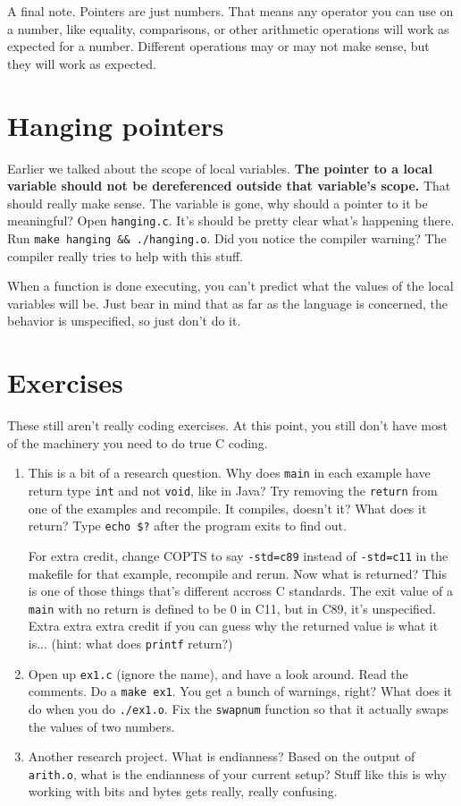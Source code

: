 \documentclass[ebook,11pt,oneside,openany]{memoir}
\newcommand{\cf}[1]{\texttt{#1}}
\begin{document}
A final note. Pointers are just numbers. That means any operator you can use on a number, like equality, comparisons, or other arithmetic operations will work as expected for a number. Different operations may or may not make sense, but they will work as expected.

\section{Hanging pointers}

Earlier we talked about the scope of local variables. \textbf{The pointer to a local variable should not be dereferenced outside that variable's scope.} That should really make sense. The variable is gone, why should a pointer to it be meaningful? Open \texttt{hanging.c}. It's should be pretty clear what's happening there. Run \texttt{make hanging \&\& ./hanging.o}. Did you notice the compiler warning? The compiler really tries to help with this stuff. 

When a function is done executing, you can't predict what the values of the local variables will be. Just bear in mind that as far as the language is concerned, the behavior is unspecified, so just don't do it.

\section{Exercises}

These still aren't really coding exercises. At this point, you still don't have most of the machinery you need to do true C coding.

\begin{enumerate}
\item This is a bit of a research question. Why does \texttt{main} in each example have return type \texttt{int} and not \texttt{void}, like in Java? Try removing the \texttt{return} from one of the examples and recompile.  It compiles, doesn't it? What does it return? Type \texttt{echo \$?} after the program exits to find out.

For extra credit, change COPTS to say \texttt{-std=c89} instead of \cf{-std=c11} in the makefile for that example, recompile and rerun. Now what is returned? This is one of those things that's different accross C standards. The exit value of a \texttt{main} with no return is defined to be 0 in C11, but in C89, it's unspecified. Extra extra extra credit if you can guess why the returned value is what it is... (hint: what does \cf{printf} return?)

\item Open up \cf{ex1.c} (ignore the name), and have a look around. Read the comments. Do a \cf{make ex1}. You get a bunch of warnings, right? What does it do when you do \cf{./ex1.o}. Fix the \cf{swapnum} function so that it actually swaps the values of two numbers.

\item Another research project. What is endianness? Based on the output of \texttt{arith.o}, what is the endianness of your current setup? Stuff like this is why working with bits and bytes gets really, really confusing.
\end{enumerate}
\end{document}
